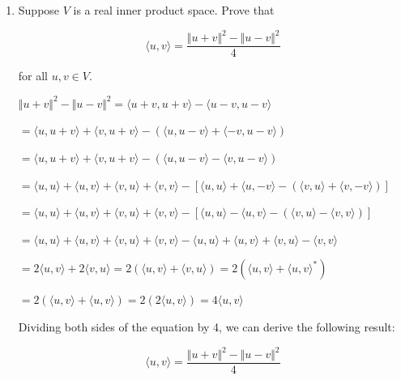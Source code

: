 \documentclass[fleqn]{article}
\makeatletter
\newenvironment{equationCenter}{\@fleqnfalse\begin{equation*}}{\end{equation*}}
\makeatother
\begin{document}
\begin{enumerate}[nolistsep]
			\item Suppose $V$ is a real inner product space. Prove that
			
				\begin{equationCenter}
					\langle u, v\rangle = \frac{{\Vert u + v \Vert}^2 - {\Vert u - v \Vert}^2}{4}
				\end{equationCenter}
				
				for all $u, v \in V$.
				
				${\Vert u + v \Vert}^2 - {\Vert u - v \Vert}^2 = \langle u + v, u + v \rangle - \langle u - v, u - v \rangle$
				
				$ = \langle u, u + v \rangle + \langle v, u + v \rangle - (\langle u, u - v\rangle + \langle -v, u - v \rangle)$
				
				$ = \langle u, u + v \rangle + \langle v, u + v \rangle - (\langle u, u - v\rangle - \langle v, u - v \rangle)$
					
				$ = \langle u, u \rangle + \langle u, v \rangle + \langle v, u \rangle + \langle v, v \rangle - [\langle u, u\rangle + \langle u, -v\rangle - (\langle v, u \rangle + \langle v, -v \rangle)]$
				
				$ = \langle u, u \rangle + \langle u, v \rangle + \langle v, u \rangle + \langle v, v \rangle - [\langle u, u\rangle - \langle u, v\rangle - (\langle v, u \rangle - \langle v, v \rangle)]$
				
				$ = \langle u, u \rangle + \langle u, v \rangle + \langle v, u \rangle + \langle v, v \rangle - \langle u, u\rangle + \langle u, v\rangle + \langle v, u \rangle - \langle v, v \rangle$
				
				$ = 2\langle u, v \rangle + 2 \langle v, u \rangle = 2(\langle u, v \rangle + \langle v, u \rangle) = 2(\langle u, v \rangle + {\langle u, v \rangle}^*)$
				
				$ = 2(\langle u, v \rangle + \langle u, v \rangle) = 2(2\langle u, v \rangle) = 4\langle u, v \rangle$
				
				Dividing both sides of the equation by 4, we can derive the following result:
				
				\begin{equation*}
					\langle u, v\rangle = \frac{{\Vert u + v \Vert}^2 - {\Vert u - v \Vert}^2}{4}
				\end{equation*}
	\end{enumerate}
\end{document}
